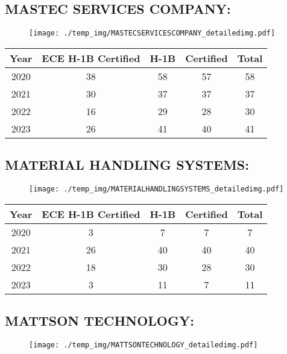 \documentclass{article}%
\begin{document}
%
\newpage%
\subsection{MASTEC SERVICES COMPANY:}%
\label{subsec:MASTECSERVICESCOMPANY}%
\label{MASTECSERVICESCOMPANYdetailed}%


\begin{figure}[htbp]%
\centering%
\texttt{[image: ./temp\_img/MASTECSERVICESCOMPANY\_detailedimg.pdf]}%
\end{figure}

%
\begin{longtable}{c|c|c|c|c}%
\hline%
Year&ECE H{-}1B Certified&H{-}1B&Certified&Total\\%
\hline%
2020&38&58&57&58\\%
\hline%
2021&30&37&37&37\\%
\hline%
2022&16&29&28&30\\%
\hline%
2023&26&41&40&41\\%
\hline%
\end{longtable}

%
\newpage%
\subsection{MATERIAL HANDLING SYSTEMS:}%
\label{subsec:MATERIALHANDLINGSYSTEMS}%
\label{MATERIALHANDLINGSYSTEMSdetailed}%


\begin{figure}[htbp]%
\centering%
\texttt{[image: ./temp\_img/MATERIALHANDLINGSYSTEMS\_detailedimg.pdf]}%
\end{figure}

%
\begin{longtable}{c|c|c|c|c}%
\hline%
Year&ECE H{-}1B Certified&H{-}1B&Certified&Total\\%
\hline%
2020&3&7&7&7\\%
\hline%
2021&26&40&40&40\\%
\hline%
2022&18&30&28&30\\%
\hline%
2023&3&11&7&11\\%
\hline%
\end{longtable}

%
\newpage%
\subsection{MATTSON TECHNOLOGY:}%
\label{subsec:MATTSONTECHNOLOGY}%
\label{MATTSONTECHNOLOGYdetailed}%


\begin{figure}[htbp]%
\centering%
\texttt{[image: ./temp\_img/MATTSONTECHNOLOGY\_detailedimg.pdf]}%
\end{figure}
\end{document}
